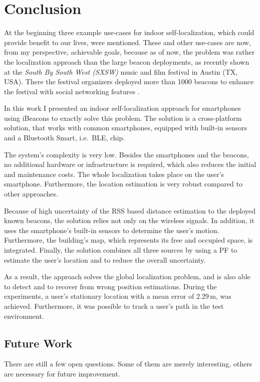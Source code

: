 \chapter{Conclusion} \label{chap:conclusion}
At the beginning three example use-cases for indoor self-localization, which could provide benefit to our lives, were mentioned. These and other use-cases are now, from my perspective, achievable goals, because as of now, the problem was rather the localization approach than the large beacon deployments, as recently shown at the \emph{South By South West (SXSW)} music and film festival in Austin (TX, USA). There the festival organizers deployed more than 1000 beacons to enhance the festival with social networking features \citep{mashable}.

In this work I presented an indoor self-localization approach for smartphones using iBeacons to exactly solve this problem. The solution is a cross-platform solution, that works with common smartphones, equipped with built-in sensors and a Bluetooth Smart, i.e.\ \acl{BLE}, chip.

The system's complexity is very low. Besides the smartphones and the beacons, no additional hardware or infrastructure is required, which also reduces the initial and maintenance costs. The whole localization takes place on the user's smartphone. Furthermore, the location estimation is very robust compared to other approaches.

Because of high uncertainty of the \acs{RSS} based distance estimation to the deployed known beacons, the solution relies not only on the wireless signals. In addition, it uses the smartphone's built-in sensors to determine the user's motion. Furthermore, the building's map, which represents its free and occupied space, is integrated. Finally, the solution combines all three sources by using a \acl{PF} to estimate the user's location and to reduce the overall uncertainty.

As a result, the approach solves the global localization problem, and is also able to detect and to recover from wrong position estimations. During the experiments, a user's stationary location with a mean error of 2.29\,m, was achieved. Furthermore, it was possible to track a user's path in the test environment.


\section{Future Work} \label{sec:future}
There are still a few open questions. Some of them are merely interesting, others are necessary for future improvement.

